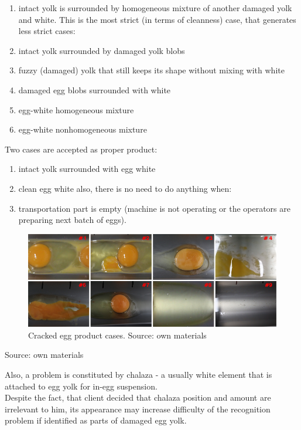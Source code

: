 \documentclass[12pt,twoside,a4paper]{article}
\begin{document}
\begin{enumerate}
\item intact yolk is surrounded by homogeneous mixture of another damaged yolk and white.
This is the most strict (in terms of cleanness) case, that generates less strict cases:
\item intact yolk surrounded by damaged yolk blobs
\item fuzzy (damaged) yolk that still keeps its shape without mixing with white
\item damaged egg blobs surrounded with white
\item egg-white homogeneous mixture
\item egg-white nonhomogeneous mixture
\end{enumerate}
Two cases are accepted as proper product:
\begin{enumerate}[resume]
\item intact yolk surrounded with egg white
\item clean egg white
also, there is no need to do anything when:
\item transportation part is empty (machine is not operating or the operators are preparing next batch of eggs).
\end{enumerate}

 

\begin{figure}[H]
\centering
\includegraphics[width=0.8\paperwidth]{8of9}
\caption{Cracked egg product cases. Source: own materials }
\end{figure}
Source: own materials 

Also, a problem is constituted by chalaza - a usually white element that is attached to egg yolk for in-egg suspension.\\
Despite the fact, that client decided that chalaza position and amount are irrelevant to him, its appearance may increase difficulty of the recognition problem if identified as parts of damaged egg yolk.
\end{document}
